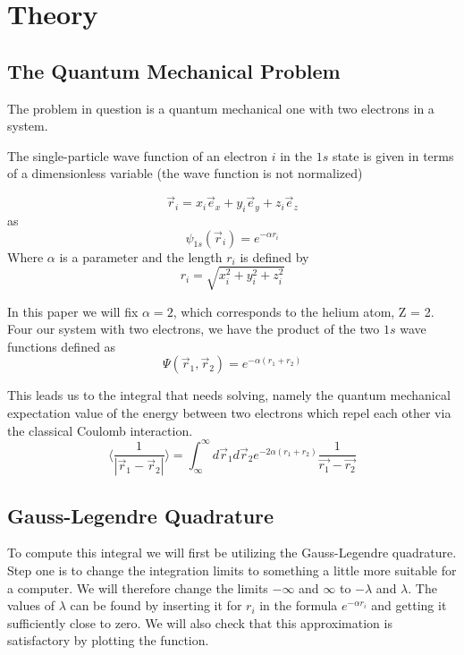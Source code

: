 \documentclass[../main.tex]{subfiles}
\begin{document}
\section{Theory} \label{sec:theory}
\subsection{The Quantum Mechanical Problem} \label{sec:QMProb}
The problem in question is a quantum mechanical one with two electrons in a system.

The single-particle wave function of an electron $i$ in the $1s$ state is given in terms of a dimensionless variable (the wave function is not normalized)

\[\vec{r}_i = x_i \vec{e}_x + y_i \vec{e}_y + z_i \vec{e}_z\]
as
\[\psi_{1s}(\vec{r}_i) = e^{-\alpha r_i}\]
Where $\alpha$ is a parameter and the length $r_i$ is defined by
\[r_i = \sqrt{x_i^2 + y_i^2 + z_i^2}\]

In this paper we will fix $\alpha = 2$, which corresponds to the helium atom, Z = 2.\\

Four our system with two electrons, we have the product of the two $1s$ wave functions defined as
\[\Psi(\vec{r}_1, \vec{r}_2) = e^{-\alpha(r_1 + r_2)}\]

This leads us to the integral that needs solving, namely the quantum mechanical expectation value of the energy between two electrons which repel each other via the classical Coulomb interaction.
\[\langle \frac{1}{|\vec{r}_1 - \vec{r}_2|} \rangle = \int_{\infty}^\infty d\vec{r}_1 d\vec{r}_2 e^{-2\alpha(r_1 + r_2)} \frac{1}{\vec{r_1} - \vec{r_2}}\]



\subsection{Gauss-Legendre Quadrature} \label{sec:GLQ}
To compute this integral we will first be utilizing the Gauss-Legendre quadrature. Step one is to change the integration limits to something a little more suitable for a computer. We will therefore change the limits $-\infty$ and $\infty$ to $-\lambda$ and $\lambda$. The values of $\lambda$ can be found by inserting it for $r_i$ in the formula $e^{-\alpha r_i}$ and getting it sufficiently close to zero.  We will also check that this approximation is satisfactory by plotting the function.
\end{document}
